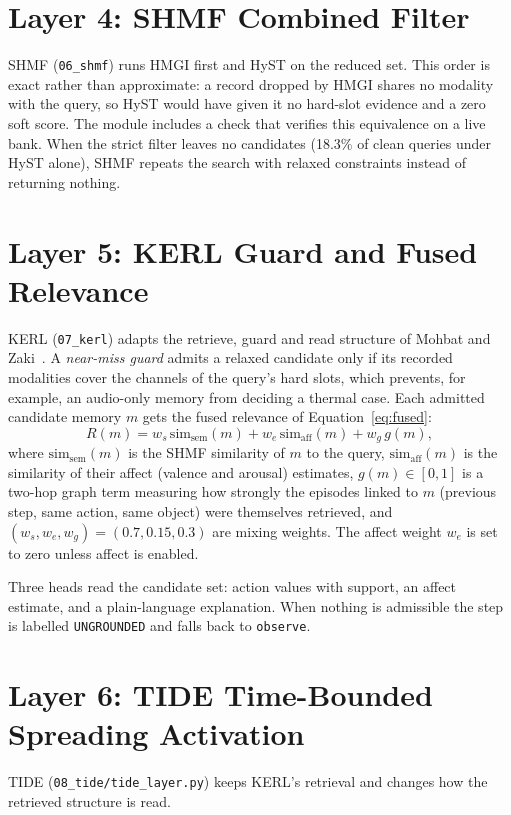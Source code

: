 \documentclass[12pt,a4paper,oneside]{report}
\newcommand{\code}[1]{\texttt{\small #1}}
\begin{document}
\section{Layer 4: SHMF Combined Filter}
SHMF (\code{06\_shmf}) runs HMGI first and HyST on the reduced set. This order is exact rather than approximate: a record dropped by HMGI shares no modality with the query, so HyST would have given it no hard-slot evidence and a zero soft score. The module includes a check that verifies this equivalence on a live bank. When the strict filter leaves no candidates (18.3\% of clean queries under HyST alone), SHMF repeats the search with relaxed constraints instead of returning nothing.

\section{Layer 5: KERL Guard and Fused Relevance}
KERL (\code{07\_kerl}) adapts the retrieve, guard and read structure of Mohbat and Zaki~\cite{mohbat2025}. A \emph{near-miss guard} admits a relaxed candidate only if its recorded modalities cover the channels of the query's hard slots, which prevents, for example, an audio-only memory from deciding a thermal case. Each admitted candidate memory $m$ gets the fused relevance of Equation~\eqref{eq:fused}:
\begin{equation}
  R(m) = w_s\,\mathrm{sim}_{\text{sem}}(m) + w_e\,\mathrm{sim}_{\text{aff}}(m) + w_g\,g(m),
  \label{eq:fused}
\end{equation}
where $\mathrm{sim}_{\text{sem}}(m)$ is the SHMF similarity of $m$ to the query, $\mathrm{sim}_{\text{aff}}(m)$ is the similarity of their affect (valence and arousal) estimates, $g(m) \in [0,1]$ is a two-hop graph term measuring how strongly the episodes linked to $m$ (previous step, same action, same object) were themselves retrieved, and $(w_s, w_e, w_g) = (0.7, 0.15, 0.3)$ are mixing weights. The affect weight $w_e$ is set to zero unless affect is enabled.

Three heads read the candidate set: action values with support, an affect estimate, and a plain-language explanation. When nothing is admissible the step is labelled \code{UNGROUNDED} and falls back to \code{observe}.

\section{Layer 6: TIDE Time-Bounded Spreading Activation}\label{sec:tide}
TIDE (\code{08\_tide/tide\_layer.py}) keeps KERL's retrieval and changes how the retrieved structure is read.
\end{document}
